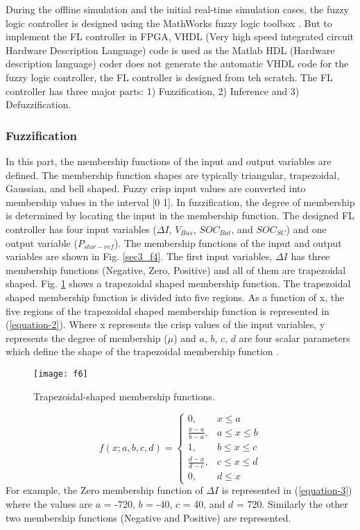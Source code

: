 During the offline simulation and the initial real-time simulation cases, the fuzzy logic controller is designed using the MathWorks fuzzy logic toolbox \cite{WinNT6}. But to implement the FL controller in FPGA, VHDL (Very high speed integrated circuit Hardware Description Language) code is used as the Matlab HDL (Hardware description language) coder does not generate the automatic VHDL code for the fuzzy logic controller, the FL controller is designed from teh scratch. The FL controller has three major parts: 1) Fuzzification, 2) Inference and 3) Defuzzification.

\subsubsection{Fuzzification}
In this part, the membership functions of the input and output variables are defined. The membership function shapes are typically triangular, trapezoidal, Gaussian, and bell shaped. Fuzzy crisp input values are converted into membership values in the interval [0 1]. In fuzzification, the degree of membership is determined by locating the input in the membership function. The designed FL controller has four input variables ($\Delta I$, $V_{Bus}$, $SOC_{Bat}$, and $SOC_{SC}$) and one output variable ($P_{stor-ref}$). The membership functions of the input and output variables are shown in Fig. \ref{sec3_f4}. The first input variables, $\Delta I$ has three membership functions (Negative, Zero, Positive) and all of them are trapezoidal shaped. Fig. \ref{sec4_f6} shows a trapezoidal shaped membership function. The trapezoidal shaped membership function is divided into five regions. As a function of x, the five regions of the trapezoidal shaped membership function is represented in (\ref{equation-2}). Where x represents the crisp values of the input variables, y represents the degree of membership ($\mu$) and $a$, $b$, $c$, $d$ are four scalar parameters which define the shape of the trapezoidal membership function \cite{anand2012design}.
\begin{figure}[ht!]
\centering
\texttt{[image: f6]}
\caption{Trapezoidal-shaped membership functions.}
\label{sec4_f6}
\end{figure} 
\begin{equation}\label{equation-2}
f(x;a,b,c,d)=
    \begin{cases}
      0, &  x\leq a\\
      \frac{x-a}{b-a}, & a\leq x \leq b \\
       1, & b\leq x \leq c \\
       \frac{d-x}{d-c}, & c\leq x \leq d \\
       0, &  d\leq x
    \end{cases}
\end{equation}
For example, the Zero membership function of $\Delta I$ is represented in (\ref{equation-3}) where the values are $a$ = -720, $b$ = -40, $c$ = 40, and $d$ = 720. Similarly the other two membership functions (Negative and Positive) are represented. 

